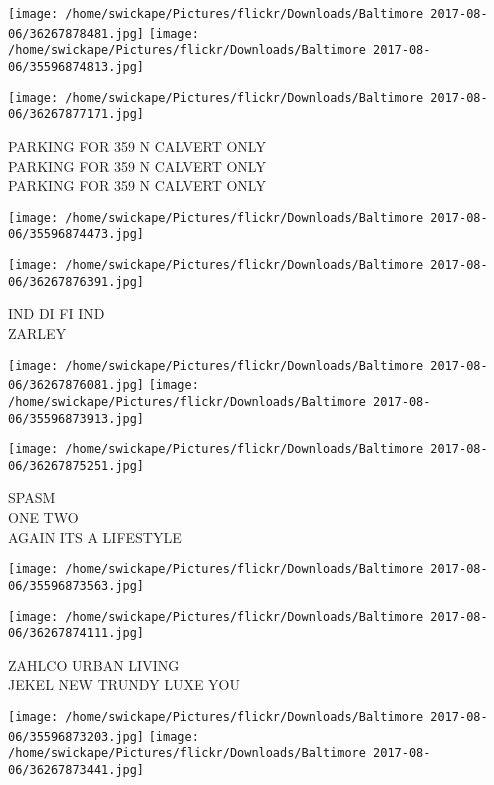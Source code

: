 \documentclass[10pt,letterpaper]{article}
\begin{document}
\texttt{[image: /home/swickape/Pictures/flickr/Downloads/Baltimore 2017-08-06/36267878481.jpg]}
\texttt{[image: /home/swickape/Pictures/flickr/Downloads/Baltimore 2017-08-06/35596874813.jpg]}

\texttt{[image: /home/swickape/Pictures/flickr/Downloads/Baltimore 2017-08-06/36267877171.jpg]}

PARKING FOR 359 N CALVERT ONLY\\
PARKING FOR 359 N CALVERT ONLY\\
PARKING FOR 359 N CALVERT ONLY\\
\pagebreak

\texttt{[image: /home/swickape/Pictures/flickr/Downloads/Baltimore 2017-08-06/35596874473.jpg]}

\vspace{0.25in}
\texttt{[image: /home/swickape/Pictures/flickr/Downloads/Baltimore 2017-08-06/36267876391.jpg]}

IND DI FI IND\\
ZARLEY\\
\pagebreak

\texttt{[image: /home/swickape/Pictures/flickr/Downloads/Baltimore 2017-08-06/36267876081.jpg]}
\texttt{[image: /home/swickape/Pictures/flickr/Downloads/Baltimore 2017-08-06/35596873913.jpg]}

\vspace{0.25in}
\texttt{[image: /home/swickape/Pictures/flickr/Downloads/Baltimore 2017-08-06/36267875251.jpg]}

SPASM\\
ONE TWO\\
AGAIN ITS A LIFESTYLE\\
\pagebreak

\texttt{[image: /home/swickape/Pictures/flickr/Downloads/Baltimore 2017-08-06/35596873563.jpg]}

\vspace{0.25in}
\texttt{[image: /home/swickape/Pictures/flickr/Downloads/Baltimore 2017-08-06/36267874111.jpg]}

ZAHLCO URBAN LIVING\\
JEKEL NEW TRUNDY LUXE YOU\\
\pagebreak

\texttt{[image: /home/swickape/Pictures/flickr/Downloads/Baltimore 2017-08-06/35596873203.jpg]}
\texttt{[image: /home/swickape/Pictures/flickr/Downloads/Baltimore 2017-08-06/36267873441.jpg]}
\end{document}
